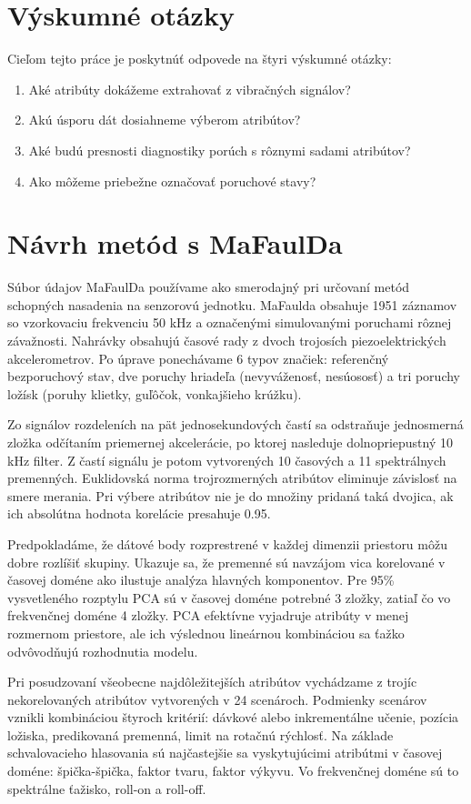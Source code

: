 \section{Výskumné otázky}
Cieľom tejto práce je poskytnúť odpovede na štyri výskumné otázky:
\begin{enumerate}
\itemsep0pt
\item Aké atribúty dokážeme extrahovať z vibračných signálov?
\item Akú úsporu dát dosiahneme výberom atribútov?
\item Aké budú presnosti diagnostiky porúch s rôznymi sadami atribútov?
\item Ako môžeme priebežne označovať poruchové stavy?
\end{enumerate}

\section{Návrh metód s MaFaulDa}
Súbor údajov MaFaulDa používame ako smerodajný pri určovaní metód schopných nasadenia na senzorovú jednotku. MaFaulda obsahuje 1951 záznamov so vzorkovaciu frekvenciu 50 kHz a označenými simulovanými poruchami rôznej závažnosti. Nahrávky obsahujú časové rady z dvoch trojosích piezoelektrických akcelerometrov. Po úprave ponechávame 6 typov značiek: referenčný bezporuchový stav, dve poruchy hriadeľa (nevyváženosť, nesúososť) a tri poruchy ložísk (poruhy klietky, guľôčok, vonkajšieho krúžku). 

Zo signálov rozdeleních na pät jednosekundových častí sa odstraňuje jednosmerná zložka odčítaním priemernej akcelerácie, po ktorej nasleduje dolnopriepustný 10 kHz filter. Z častí signálu je potom vytvorených 10 časových a 11 spektrálnych premenných. Euklidovská norma trojrozmerných atribútov eliminuje závislosť na smere merania. Pri výbere atribútov nie je do množiny pridaná taká dvojica, ak ich absolútna hodnota korelácie presahuje 0.95.

Predpokladáme, že dátové body rozprestrené v každej dimenzii priestoru môžu dobre rozlíšiť skupiny. Ukazuje sa, že premenné sú navzájom vica korelované v časovej doméne ako ilustuje analýza hlavných komponentov. Pre 95\% vysvetleného rozptylu PCA sú v časovej doméne potrebné 3 zložky, zatiaľ čo vo frekvenčnej doméne 4 zložky. PCA efektívne vyjadruje atribúty v menej rozmernom priestore, ale ich výslednou lineárnou kombináciou sa ťažko odvôvodňujú rozhodnutia modelu.

Pri posudzovaní všeobecne najdôležitejších atribútov vychádzame z trojíc nekorelovaných atribútov vytvorených v 24 scenároch. Podmienky scenárov vznikli kombináciou štyroch kritérií: dávkové alebo inkrementálne učenie, pozícia ložiska, predikovaná premenná, limit na rotačnú rýchlosť. Na základe schvalovacieho hlasovania sú najčastejšie sa vyskytujúcimi atribútmi v časovej doméne: špička-špička, faktor tvaru, faktor výkyvu. Vo frekvenčnej doméne sú to spektrálne ťažisko, roll-on a roll-off.


